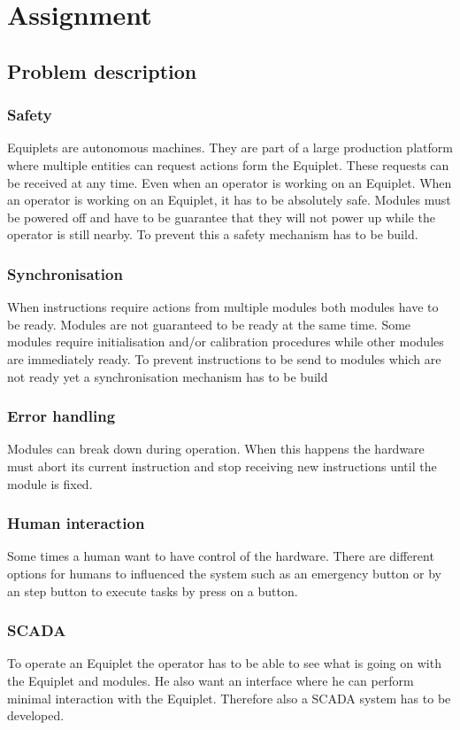 \documentclass[12pt,a4paper]{report}
\begin{document}
\chapter{Assignment}
\section{Problem description}
\subsection{Safety}
Equiplets are autonomous machines. 
They are part of a large production platform where multiple entities can request actions form the Equiplet. These requests can be received at any time. Even when an operator is working on an Equiplet. When an operator is working on an Equiplet, it has to be absolutely safe.
Modules must be powered off and have to be guarantee that they will not power up while the operator is still nearby.
To prevent this a safety mechanism has to be build.
\subsection{Synchronisation}
When instructions require actions from multiple modules both modules have to be ready.
Modules are not guaranteed to be ready at the same time. Some modules require initialisation  and/or calibration procedures while other modules are immediately ready. 
To prevent instructions to be send to modules which are not ready yet a synchronisation mechanism has to be build
\subsection{Error handling}
Modules can break down during operation. When this happens the hardware must abort its current instruction and stop receiving new instructions until the module is fixed.
\subsection{Human interaction}
Some times a human want to have control of the hardware. There are different options for humans to influenced the system such as an emergency button or by an step button to execute tasks by press on a button.

\subsection{SCADA}
To operate an Equiplet the operator has to be able to see what is going on with the Equiplet and modules. He also want an interface where he can perform minimal interaction with the Equiplet. Therefore also a SCADA system has to be developed.
\end{document}
